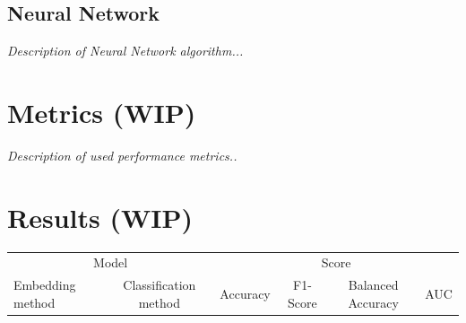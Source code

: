 \subsection{Neural Network}
\textit{Description of Neural Network algorithm...}

\section{Metrics (WIP)}
\textit{Description of used performance metrics..}


\section{Results (WIP)}

\begin{table}[htb]
\centering
\begin{tabular}{l|c|c|c|c|c}
\hline


\multicolumn{2}{c|}{Model} & \multicolumn{4}{c}{Score} \\
\cline{1-6}
Embedding method & Classification method & Accuracy & F1-Score & Balanced Accuracy & AUC \\


\end{tabular}
\end{table}
